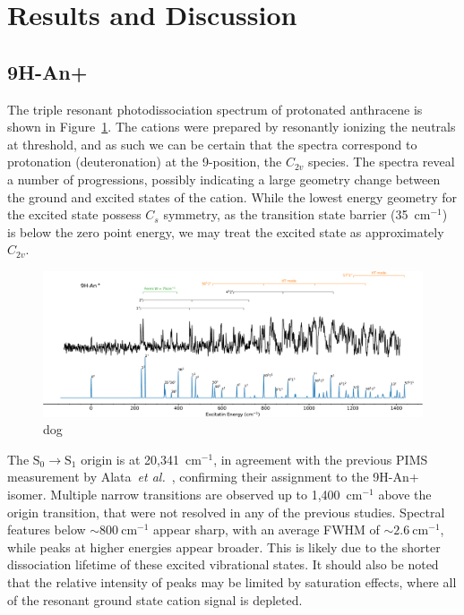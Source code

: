 \documentclass[journal=jpcafh,manuscript=article,layout=onecolumn, 12pt]{achemso}
\begin{document}
\section{Results and Discussion}
\subsection{9H-An+}
The triple resonant photodissociation spectrum of protonated anthracene is shown in Figure~\ref{Fig:4}. The cations were prepared by resonantly ionizing the neutrals at threshold, and as such we can be certain that the spectra correspond to protonation (deuteronation) at the 9-position, the $C_{2v}$ species. The spectra reveal a number of progressions, possibly indicating a large geometry change between the ground and excited states of the cation. While the lowest energy geometry for the excited state possess $C_s$ symmetry, as the transition state barrier (35~cm$^{-1}$) is below the zero point energy, we may treat the excited state as approximately $C_{2v}$. 

\begin{figure} [h]
	\includegraphics[width=1\textwidth]{figures/9H-An+w}
	\caption{dog}
	\label{Fig:4}
\end{figure}

The $\text{S}_0\rightarrow \text{S}_1$ origin is at 20,341~cm$^{-1}$, in agreement with the previous PIMS measurement by Alata~\emph{et al.}~\cite{ala10}, confirming their assignment to the 9H-An+ isomer. Multiple narrow transitions are observed up to 1,400~cm$^{-1}$ above the origin transition, that were not resolved in any of the previous studies. Spectral features below $\sim800~$cm$^{-1}$ appear sharp, with an average FWHM of $\sim 2.6~$cm$^{-1}$, while peaks at higher energies appear broader. This is likely due to the shorter dissociation lifetime of these excited vibrational states. It should also be noted that the relative intensity of peaks may be limited by saturation effects, where all of the resonant ground state cation signal is depleted.
\end{document}
